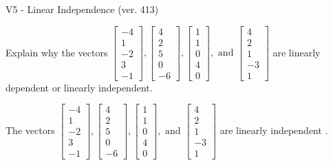 \begin{exercise}
  \begin{exerciseTitle}V5 - Linear Independence (ver. 413)\end{exerciseTitle}
  \begin{exerciseStatement}
    Explain why the vectors \(\left[\begin{array}{r}
-4 \\
1 \\
-2 \\
3 \\
-1
\end{array}\right] , \left[\begin{array}{r}
4 \\
2 \\
5 \\
0 \\
-6
\end{array}\right] , \left[\begin{array}{r}
1 \\
1 \\
0 \\
4 \\
0
\end{array}\right] , \text{ and } \left[\begin{array}{r}
4 \\
2 \\
1 \\
-3 \\
1
\end{array}\right]\) are linearly dependent or linearly independent.	


  \end{exerciseStatement}
  \begin{exerciseAnswer}
   The vectors \(\left[\begin{array}{r}
-4 \\
1 \\
-2 \\
3 \\
-1
\end{array}\right] , \left[\begin{array}{r}
4 \\
2 \\
5 \\
0 \\
-6
\end{array}\right] , \left[\begin{array}{r}
1 \\
1 \\
0 \\
4 \\
0
\end{array}\right] , \text{ and } \left[\begin{array}{r}
4 \\
2 \\
1 \\
-3 \\
1
\end{array}\right]\) are 
  	 linearly independent  .
  


  \end{exerciseAnswer}
\end{exercise}